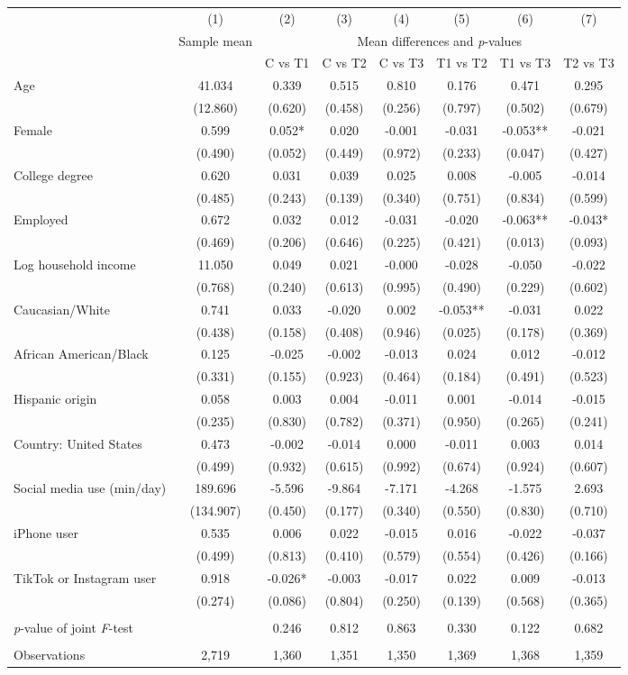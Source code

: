 \begin{tabular}{l*{7}c}
\toprule
 & (1) & (2) & (3) & (4) & (5) & (6) & (7) \\
 & \multicolumn{1}{c}{Sample mean} & \multicolumn{6}{c}{Mean differences and \textit{p}-values}\\ \cmidrule(lr){2-2} \cmidrule(lr){3-8}
  &  & C vs T1 & C vs T2 & C vs T3 & T1 vs T2 & T1 vs T3 & T2 vs T3 \\
\midrule
Age&41.034&0.339&0.515&0.810&0.176&0.471&0.295\\
&(12.860)&(0.620)&(0.458)&(0.256)&(0.797)&(0.502)&(0.679)\\
Female&0.599&0.052*&0.020&-0.001&-0.031&-0.053**&-0.021\\
&(0.490)&(0.052)&(0.449)&(0.972)&(0.233)&(0.047)&(0.427)\\
College degree&0.620&0.031&0.039&0.025&0.008&-0.005&-0.014\\
&(0.485)&(0.243)&(0.139)&(0.340)&(0.751)&(0.834)&(0.599)\\
Employed&0.672&0.032&0.012&-0.031&-0.020&-0.063**&-0.043*\\
&(0.469)&(0.206)&(0.646)&(0.225)&(0.421)&(0.013)&(0.093)\\
Log household income&11.050&0.049&0.021&-0.000&-0.028&-0.050&-0.022\\
&(0.768)&(0.240)&(0.613)&(0.995)&(0.490)&(0.229)&(0.602)\\
Caucasian/White&0.741&0.033&-0.020&0.002&-0.053**&-0.031&0.022\\
&(0.438)&(0.158)&(0.408)&(0.946)&(0.025)&(0.178)&(0.369)\\
African American/Black&0.125&-0.025&-0.002&-0.013&0.024&0.012&-0.012\\
&(0.331)&(0.155)&(0.923)&(0.464)&(0.184)&(0.491)&(0.523)\\
Hispanic origin&0.058&0.003&0.004&-0.011&0.001&-0.014&-0.015\\
&(0.235)&(0.830)&(0.782)&(0.371)&(0.950)&(0.265)&(0.241)\\
Country: United States&0.473&-0.002&-0.014&0.000&-0.011&0.003&0.014\\
&(0.499)&(0.932)&(0.615)&(0.992)&(0.674)&(0.924)&(0.607)\\
Social media use (min/day)&189.696&-5.596&-9.864&-7.171&-4.268&-1.575&2.693\\
&(134.907)&(0.450)&(0.177)&(0.340)&(0.550)&(0.830)&(0.710)\\
iPhone user&0.535&0.006&0.022&-0.015&0.016&-0.022&-0.037\\
&(0.499)&(0.813)&(0.410)&(0.579)&(0.554)&(0.426)&(0.166)\\
TikTok or Instagram user&0.918&-0.026*&-0.003&-0.017&0.022&0.009&-0.013\\
&(0.274)&(0.086)&(0.804)&(0.250)&(0.139)&(0.568)&(0.365)\\
& & & & & & & \\ \textit{p}-value of joint \textit{F}-test & & 0.246 & 0.812 & 0.863 & 0.330 & 0.122 & 0.682 \\ & & & & & & & \\ \midrule
Observations & 2,719 & 1,360 & 1,351 & 1,350 & 1,369 & 1,368 & 1,359 \\
\bottomrule
\end{tabular}
